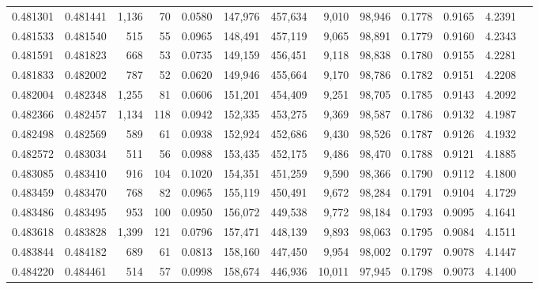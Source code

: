 \begin{tabular}{rrrrrrrrrrrrr}
0.481301 & 0.481441 & 1,136 &    70 &                                     0.0580 & 147,976 & 457,634 &   9,010 &  98,946 & 0.1778 & 0.9165 & 4.2391 \\
0.481533 & 0.481540 &   515 &    55 &                                     0.0965 & 148,491 & 457,119 &   9,065 &  98,891 & 0.1779 & 0.9160 & 4.2343 \\
0.481591 & 0.481823 &   668 &    53 &                                     0.0735 & 149,159 & 456,451 &   9,118 &  98,838 & 0.1780 & 0.9155 & 4.2281 \\
0.481833 & 0.482002 &   787 &    52 &                                     0.0620 & 149,946 & 455,664 &   9,170 &  98,786 & 0.1782 & 0.9151 & 4.2208 \\
0.482004 & 0.482348 & 1,255 &    81 &                                     0.0606 & 151,201 & 454,409 &   9,251 &  98,705 & 0.1785 & 0.9143 & 4.2092 \\
0.482366 & 0.482457 & 1,134 &   118 &                                     0.0942 & 152,335 & 453,275 &   9,369 &  98,587 & 0.1786 & 0.9132 & 4.1987 \\
0.482498 & 0.482569 &   589 &    61 &                                     0.0938 & 152,924 & 452,686 &   9,430 &  98,526 & 0.1787 & 0.9126 & 4.1932 \\
0.482572 & 0.483034 &   511 &    56 &                                     0.0988 & 153,435 & 452,175 &   9,486 &  98,470 & 0.1788 & 0.9121 & 4.1885 \\
0.483085 & 0.483410 &   916 &   104 &                                     0.1020 & 154,351 & 451,259 &   9,590 &  98,366 & 0.1790 & 0.9112 & 4.1800 \\
0.483459 & 0.483470 &   768 &    82 &                                     0.0965 & 155,119 & 450,491 &   9,672 &  98,284 & 0.1791 & 0.9104 & 4.1729 \\
0.483486 & 0.483495 &   953 &   100 &                                     0.0950 & 156,072 & 449,538 &   9,772 &  98,184 & 0.1793 & 0.9095 & 4.1641 \\
0.483618 & 0.483828 & 1,399 &   121 &                                     0.0796 & 157,471 & 448,139 &   9,893 &  98,063 & 0.1795 & 0.9084 & 4.1511 \\
0.483844 & 0.484182 &   689 &    61 &                                     0.0813 & 158,160 & 447,450 &   9,954 &  98,002 & 0.1797 & 0.9078 & 4.1447 \\
0.484220 & 0.484461 &   514 &    57 &                                     0.0998 & 158,674 & 446,936 &  10,011 &  97,945 & 0.1798 & 0.9073 & 4.1400 \\

\end{tabular}
